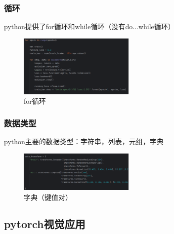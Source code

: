 \documentclass[a4paper,12pt]{article}
\begin{document}
\newpage
\subsubsection{\color{green}循环}
python提供了for循环和while循环（没有do...while循环）
\begin{figure}[h]
    \centering
    \includegraphics[width=0.5\textwidth]{for.png}
    \caption{for循环}
\end{figure}
\subsubsection{\color{green}数据类型}
python主要的数据类型：字符串，列表，元组，字典

\begin{figure}[h]
    \centering
    \includegraphics[width=0.5\textwidth]{dict.png}
    \caption{字典（键值对）}
\end{figure}





\subsection{\color{red}pytorch视觉应用}
\end{document}
